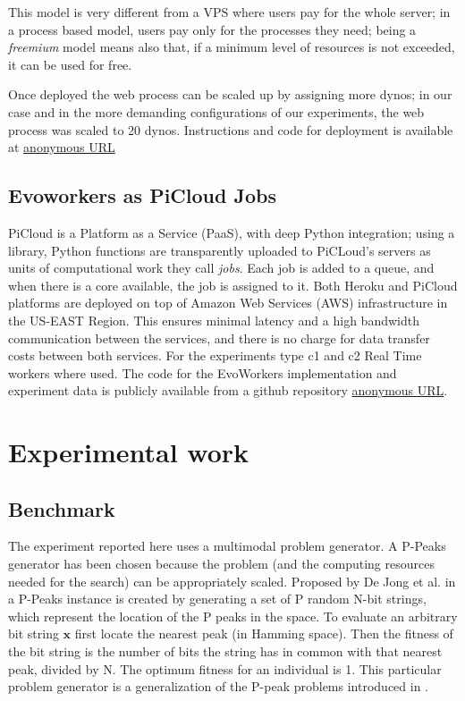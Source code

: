 \documentclass{llncs}
\begin{document}
This model is very different from a VPS where users pay for the
whole server; in a process based model, users pay only for the
processes they need; being a {\em freemium} model means also that, if
a minimum level of resources is not exceeded, it can be used for
free. 

Once deployed the web process can be scaled up by assigning more dynos;
in our case and in the more demanding configurations of our experiments, 
the web process was scaled to 20 dynos. Instructions and code for deployment 
is available at \url{anonymous URL} %



\subsection{Evoworkers as PiCloud Jobs}
PiCloud is a Platform as a Service (PaaS), with deep Python integration; 
using a library, Python functions are transparently uploaded to PiCLoud's 
servers as units of computational work they call \emph{jobs}. 
Each job is added to a queue, and when there is a core available, 
the job is assigned to it. Both Heroku and PiCloud 
platforms are deployed  on top of Amazon Web Services (AWS) 
infrastructure in the US-EAST Region. This ensures minimal 
latency and a high bandwidth communication between the services, 
and there is no charge for data transfer costs between both services.
For the experiments type c1 and c2 Real Time workers where used.  
The code for the EvoWorkers implementation and experiment data is publicly available 
from a github repository \url{anonymous URL}. 

\section{Experimental work}
\label{sec:experiments}
\subsection{Benchmark}
\label{ss:benchmark}
The experiment reported here uses a multimodal problem generator. A P-Peaks generator
has been chosen because the problem (and the computing resources needed for the search) 
can be appropriately scaled. Proposed by De Jong et al. in \cite{Jong:PS97} a
P-Peaks instance is created by generating a set of P random N-bit
strings, which represent the location of the P peaks in the space. To
evaluate an arbitrary bit string \begin{math} \mathbf{x} \end{math}
first locate the nearest peak (in Hamming space). Then the fitness of
the bit string is the number of bits the string has in common with
that nearest peak, divided by N. The optimum fitness for an individual
is 1. This particular problem generator is a generalization of the
P-peak problems introduced in \cite{Jong:1990}.            
\end{document}
